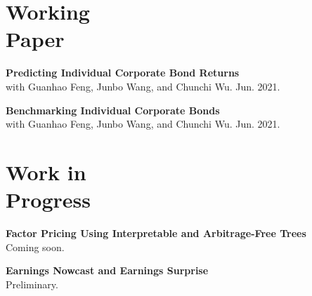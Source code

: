 \documentclass[margin]{res}
\begin{document}
\begin{resume}
\section{\sc Working \\ Paper}

\textbf{Predicting Individual Corporate Bond Returns \\}
with Guanhao Feng, Junbo Wang, and Chunchi Wu. Jun. 2021.

\textbf{Benchmarking Individual Corporate Bonds \\}
with Guanhao Feng, Junbo Wang, and Chunchi Wu.  Jun. 2021.


\section{\sc Work in \\ Progress}

\textbf{Factor Pricing Using Interpretable and Arbitrage-Free Trees \\}
Coming soon.

\textbf{Earnings Nowcast and Earnings Surprise \\}
Preliminary.






\end{resume}
\end{document}
